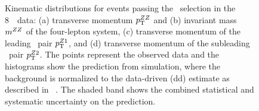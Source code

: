\begin{figure}[htbp]
\begin{center}
    \caption[Kinematic distributions for events passing the \ZZs\ selection in
    the 8~\tev\ data.]
    {Kinematic distributions for events passing the \ZZs\ selection in
    the 8~\tev\ data: (a) transverse momentum $p_{\mathrm{T}}^{ZZ}$ and (b) invariant mass $m^{ZZ}$ of the 
    four-lepton system, (c) transverse momentum of the leading
    \dilep\ pair $p_{\mathrm{T}}^{Z1}$, and (d) transverse momentum of the subleading
    \dilep\ pair $p_{\mathrm{T}}^{Z2}$. The points represent the observed data and the 
    histograms show the prediction from simulation, where the background
    is normalized to the data-driven (dd) estimate as described in
    ~. The shaded band 
    shows the combined statistical and systematic uncertainty on the prediction. 
    }
\end{center}
    \label{fig:zzdists-ZZs-eight}
\end{figure}

